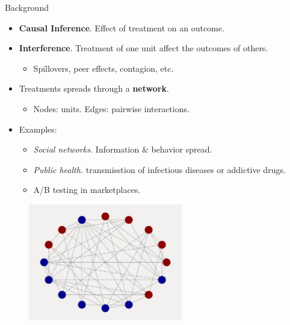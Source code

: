\documentclass{beamer}
\begin{document}
    \begin{frame}{Background}
        \large
        \begin{itemize}
            \item<1-> \textbf{Causal Inference}. Effect of treatment on an outcome. 
            \vspace{0.2cm}
            \item<2-> \textbf{Interference}. Treatment of one unit affect the outcomes of others.
            \begin{itemize}
                \item Spillovers, peer effects, contagion, etc.
            \end{itemize}
            \vspace{0.2cm}
            \item<3->  Treatments spreads through a \textbf{network}.
            \begin{itemize}
                \item Nodes: units. Edges: pairwise interactions.
            \vspace{0.2cm}
            \end{itemize}
            \item<4-> Examples:
                \begin{itemize}
                    \item \emph{Social networks.} Information \& behavior spread.
                    \vspace{0.05cm}
                    \item \emph{Public health.} transmisstion of infectious diseases or addictive drugs.
                    \vspace{0.05cm}
                    \item A/B testing in marketplaces.
                \end{itemize} 
        \end{itemize}
    \end{frame}

    \begin{frame}[t]
        \begin{figure}[t]
            \centering
            \includegraphics[width=0.6\textwidth]{figs/connected_net.png}
        \end{figure}
    \end{frame}
\end{document}
